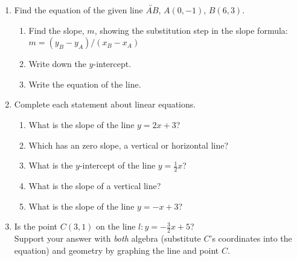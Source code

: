 \documentclass[12pt, twoside]{article}
\begin{document}
\begin{enumerate}
\newpage
\item Find the equation of the given line $\overleftrightarrow{AB}$, $A(0,-1)$, $B(6,3)$.
\begin{multicols}{2}
    \begin{enumerate}[itemsep=1.2cm]
      \item Find the slope, $m$, showing the substitution step in the slope formula: \\[0.25cm]
      $\displaystyle m = (y_B - y_A)/(x_B - x_A)$
      \item Write down the $y$-intercept.
      \item Write the equation of the line.
      \end{enumerate}
    \begin{flushright}
    \end{flushright}
\end{multicols}

\newpage
\item Complete each statement about linear equations.
\begin{enumerate}[itemsep=0.5cm]
  \item What is the slope of the line $y = 2x + 3$?
  \item Which has an zero slope, a vertical or horizontal line?
  \item What is the $y$-intercept of the line $y = \frac{1}{2}x$?
  \item What is the slope of a vertical line?
  \item What is the slope of the line $y = -x + 3$?

\end{enumerate}

\newpage
\item Is the point $C(3,1)$ on the line $l: y=-\frac{3}{2}x+5$? \\[0.5cm]
Support your answer with \emph{both} algebra (substitute $C$'s coordinates into the equation) and geometry by graphing the line and point $C$.
  \begin{flushright}
  \end{flushright}


\end{enumerate}
\end{document}
